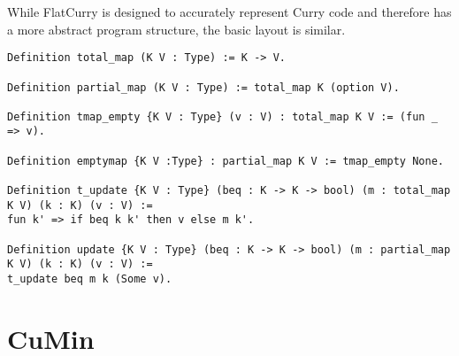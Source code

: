 \documentclass[fleqn]{scrreprt}
\begin{document}
\par
While FlatCurry is designed to accurately represent Curry code and therefore has a more abstract program structure, the basic layout is similar. 
\begin{verbatim}
Definition total_map (K V : Type) := K -> V.

Definition partial_map (K V : Type) := total_map K (option V).

Definition tmap_empty {K V : Type} (v : V) : total_map K V := (fun _ => v).

Definition emptymap {K V :Type} : partial_map K V := tmap_empty None.

Definition t_update {K V : Type} (beq : K -> K -> bool) (m : total_map K V) (k : K) (v : V) :=
fun k' => if beq k k' then v else m k'.

Definition update {K V : Type} (beq : K -> K -> bool) (m : partial_map K V) (k : K) (v : V) :=
t_update beq m k (Some v).
\end{verbatim}
\chapter{CuMin}
\end{document}
